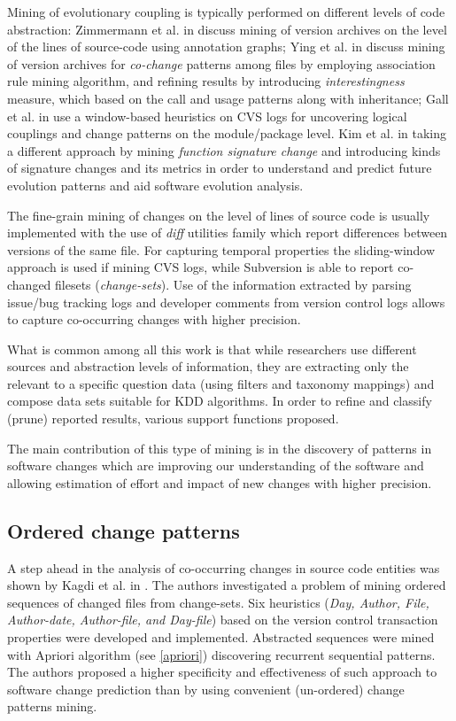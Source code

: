 Mining of evolutionary coupling is typically performed on different levels of
code abstraction: Zimmermann et al. in \cite{citeulike:4406375} discuss mining
of version archives on the level of the lines of source-code using annotation
graphs; Ying et al. in \cite{citeulike:983796} discuss mining of version
archives for \textit{co-change} patterns among files by employing association
rule mining algorithm, and refining results by introducing
\textit{interestingness} measure, which based on the call and usage patterns
along with inheritance; Gall et al. in \cite{citeulike:5397994} use a
window-based heuristics on CVS logs for uncovering logical couplings and change
patterns on the module/package level. Kim et al. in \cite{citeulike:5375867}
taking a different approach by mining \textit{function signature change} and
introducing kinds of signature changes and its metrics in order to understand
and predict future evolution patterns and aid software evolution analysis.

The fine-grain mining of changes on the level of lines of source code is usually
implemented with the use of \textit{diff} utilities family which report
differences between versions of the same file. For capturing temporal properties
the sliding-window approach is used if mining CVS logs, while Subversion is able
to report co-changed filesets (\textit{change-sets}). Use of the information
extracted by parsing issue/bug tracking logs and developer comments from version
control logs allows to capture co-occurring changes with higher precision.

What is common among all this work is that while researchers use different
sources and abstraction levels of information, they are extracting only the
relevant to a specific question data (using filters and taxonomy mappings) and
compose data sets suitable for KDD algorithms. In order to refine and classify
(prune) reported results, various support functions proposed.

The main contribution of this type of mining is in the discovery of patterns in
software changes which are improving our  understanding of the software and
allowing estimation of effort and impact of new changes with higher precision.

\subsection{Ordered change patterns}
A step ahead in the analysis of co-occurring changes in source code entities was
shown by Kagdi et al. in \cite{citeulike:3929070}. The authors investigated a
problem of mining ordered sequences of changed files from change-sets. Six
heuristics (\textit{Day, Author, File, Author-date, Author-file, and Day-file})
based on the version control transaction properties were developed and
implemented. Abstracted sequences were mined with Apriori algorithm (see
\ref{apriori}) discovering recurrent sequential patterns. The authors proposed a
higher specificity and effectiveness of such approach to software change
prediction than by using convenient (un-ordered) change patterns mining.

